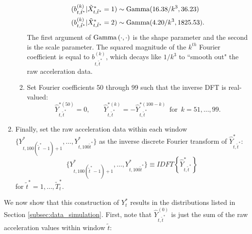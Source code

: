 \begin{enumerate}
\begin{enumerate}
    \begin{align}
    \begin{split}
    	(b^{(k)}_{t,\tilde t^*}|\tilde X^*_{t,\tilde t^*} = 1) &\sim {\rm{Gamma}}(16.38/k^3, 36.23) \\
    	(b^{(k)}_{t,\tilde t^*}|\tilde X^*_{t,\tilde t^*} = 2) &\sim {\rm{Gamma}}(4.20/k^3, 1825.53). \\ 
    \end{split}
    \label{eqn:bdist}
    \end{align}
    The first argument of ${\rm{Gamma}}\left(\cdot,\cdot\right)$ is the shape parameter and the second is the scale parameter. The squared magnitude of the $k^{th}$ Fourier coefficient is equal to $b^{(k)}_{t,\tilde t^*}$, which decays like $1/k^3$ to ``smooth out" the raw acceleration data.
    \item Set Fourier coefficients 50 through 99 such that the inverse DFT is real-valued:
    \[
    \hat{Y}^{*(50)}_{t,\tilde t^*} = 0, \qquad
	\hat{Y}^{*(k)}_{t,\tilde t^*} = -\hat{Y}^{*(100-k)}_{t,\tilde t^*} \enspace \text{for} \enspace k = 51,\ldots,99.
    \]
    \end{enumerate}
    \item Finally, set the raw acceleration data within each window $\{Y^*_{t,100(\tilde t^* - 1) + 1},\ldots,Y^*_{t,100\tilde t^*}\}$ as the inverse discrete Fourier transform of $\hat{Y}^*_{t,\tilde t^*}$:
    \[\{Y^*_{t,100(\tilde t^* - 1) + 1},\ldots,Y^*_{t,100\tilde t^*}\} \equiv IDFT\left\{\hat{Y}^*_{t,\tilde t^*}\right\}\]
    for $\tilde t^* = 1,\ldots,\tilde T^*_t.$
\end{enumerate}

We now show that this construction of $Y^*_t$ results in the distributions listed in Section \ref{subsec:data_simulation}. First, note that $\hat{Y}^{(0)}_{t,\tilde t^*}$ is just the sum of the raw acceleration values within window $\tilde t$:

